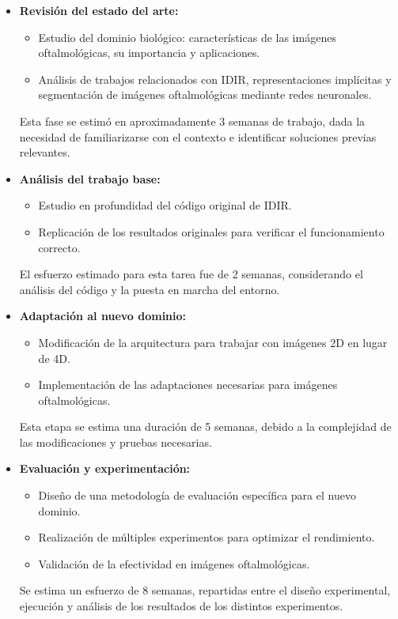 \begin{itemize}
    \item \textbf{Revisión del estado del arte:}
    \begin{itemize}
        \item Estudio del dominio biológico: características de las imágenes oftalmológicas, su importancia y aplicaciones.
        \item Análisis de trabajos relacionados con IDIR, representaciones implícitas y segmentación de imágenes oftalmológicas mediante redes neuronales.
    \end{itemize}
    Esta fase se estimó en aproximadamente 3 semanas de trabajo, dada la necesidad de familiarizarse con el contexto e identificar soluciones previas relevantes.

    \item \textbf{Análisis del trabajo base:}
    \begin{itemize}
        \item Estudio en profundidad del código original de IDIR.
        \item Replicación de los resultados originales para verificar el funcionamiento correcto.
    \end{itemize}
    El esfuerzo estimado para esta tarea fue de 2 semanas, considerando el análisis del código y la puesta en marcha del entorno.

    \item \textbf{Adaptación al nuevo dominio:}
    \begin{itemize}
        \item Modificación de la arquitectura para trabajar con imágenes 2D en lugar de 4D.
        \item Implementación de las adaptaciones necesarias para imágenes oftalmológicas.
    \end{itemize}
    Esta etapa se estima una duración de 5 semanas, debido a la complejidad de las modificaciones y pruebas necesarias.

    \item \textbf{Evaluación y experimentación:}
    \begin{itemize}
        \item Diseño de una metodología de evaluación específica para el nuevo dominio.
        \item Realización de múltiples experimentos para optimizar el rendimiento.
        \item Validación de la efectividad en imágenes oftalmológicas.
    \end{itemize}
    Se estima un esfuerzo de 8 semanas, repartidas entre el diseño experimental, ejecución y análisis de los resultados de los distintos experimentos.


\end{itemize}

